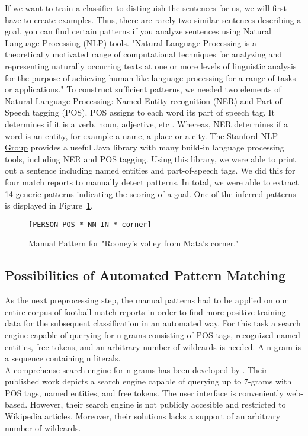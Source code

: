 \documentclass[11pt,titlepage,oneside,openany]{book}
\begin{document}
If we want to train a classifier to distinguish the sentences for us, we will first have to create examples. Thus, there are rarely two similar sentences describing a goal, you can find certain patterns if you analyze sentences using Natural Language Processing (NLP) tools. "Natural Language Processing is a theoretically motivated range of computational techniques for analyzing and representing naturally occurring texts at one or more levels of linguistic analysis for the purpose of achieving human-like language processing for a range of tasks or applications." \citep[p.1]{Liddy2001} To construct sufficient patterns, we needed two elements of Natural Language Processing: Named Entity recognition (NER) and Part-of-Speech tagging (POS). POS assigns to each word its part of speech tag. It determines if it is a verb, noun, adjective, etc \citep[p.219]{Voutilainen2005}. Whereas, NER determines if a word is an entity, for example a name, a place or a city.  
The \hyperlink{http://nlp.stanford.edu/software/CRF-NER.shtml}{Stanford NLP Group} provides a useful Java library with many build-in language processing tools, including NER and POS tagging. Using this library, we were able to print out a sentence including named entities and part-of-speech tags. We did this for four match reports to manually detect patterns. In total, we were able to extract 14 generic patterns indicating the scoring of a goal. One of the inferred patterns is displayed in Figure~\ref{fig.manualpattern}. \\
\begin{figure} [h!]
\centering
\begin{lstlisting}[frame=single]
[PERSON POS * NN IN * corner]
\end{lstlisting}
\caption{Manual Pattern for "Rooney's volley from Mata's corner."}
\label{fig.manualpattern}
\end{figure}

\subsection{Possibilities of Automated Pattern Matching}
\label{sec:automatch}
As the next preprocessing step, the manual patterns had to be applied on our entire corpus of football match reports in order to find more positive training data for the subsequent classification in an automated way. For this task a search engine capable of querying for n-grams consisting of POS tags, recognized named entities, free tokens, and an arbitrary number of wildcards is needed. A n-gram is a sequence containing n literals.\\
A comprehense search engine for n-grams has been developed by \citeauthor*{Sekine2010} \citeyearpar{Sekine2010}. Their published work depicts a search engine capable of querying up to 7-grams with POS tags, named entities, and free tokens. The user interface is conveniently web-based. However, their search engine is not publicly accesible and restricted to Wikipedia articles. Moreover,  their solutions lacks a support of an arbitrary number of wildcards.\\
\end{document}
